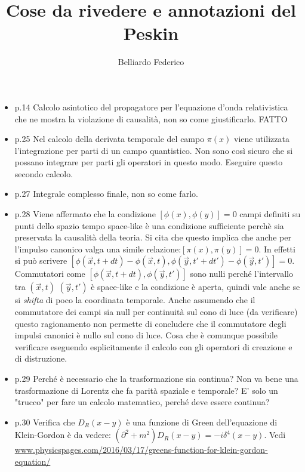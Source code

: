 \documentclass[10pt,a4paper]{article}
\author{Belliardo Federico}
\title{Cose da rivedere e annotazioni del Peskin}
\begin{document}
\maketitle

\begin{itemize}
\item p.14 Calcolo asintotico del propagatore per l'equazione d'onda relativistica che ne mostra la violazione di causalità, non so come giustificarlo. FATTO

\item p.25 Nel calcolo della derivata temporale del campo $\pi(x)$ viene utilizzata l'integrazione per parti di un campo quantistico. Non sono così sicuro che si possano integrare per parti gli operatori in questo modo. Eseguire questo secondo calcolo.

\item p.27 Integrale complesso finale, non so come farlo.

\item p.28 Viene affermato che la condizione $[\phi(x), \phi(y)] = 0$ campi definiti su punti dello spazio tempo space-like è una condizione sufficiente perchè sia preservata la causalità della teoria. Si cita che questo implica che anche per l'impulso canonico valga una simile relazione:$[\pi(x), \pi(y)] = 0$. In effetti si può scrivere $[\phi(\vec{x}, t +dt)-\phi(\vec{x},t), \phi(\vec{y}, t' +dt')-\phi(\vec{y},t')] = 0$. Commutatori come $[\phi(\vec{x}, t +dt), \phi(\vec{y}, t')] $ sono nulli perché l'intervallo tra $(\vec{x}, t)$ $(\vec{y}, t')$ è space-like e la condizione è aperta, quindi vale anche se si \emph{shifta} di poco la coordinata temporale. Anche assumendo che il commutatore dei campi sia null per continuità sul cono di luce (da verificare) questo ragionamento non permette di concludere che il commutatore degli impulsi canonici è nullo sul cono di luce. Cosa che è comunque possibile verificare eseguendo esplicitamente il calcolo con gli operatori di creazione e di distruzione.

\item p.29 Perché è necessario che la trasformazione sia continua? Non va bene una trasformazione di Lorentz che fa parità spaziale e temporale? E' solo un "trucco" per fare un calcolo matematico, perché deve essere continua?

\item p.30 Verifica che $D_R(x-y)$ è una funzione di Green dell'equazione di Klein-Gordon è da vedere: $(\partial^2+m^2) D_R(x-y) = -i \delta^4 (x-y)$. Vedi \url{www.physicspages.com/2016/03/17/greens-function-for-klein-gordon-equation/}


\end{itemize}
\end{document}

